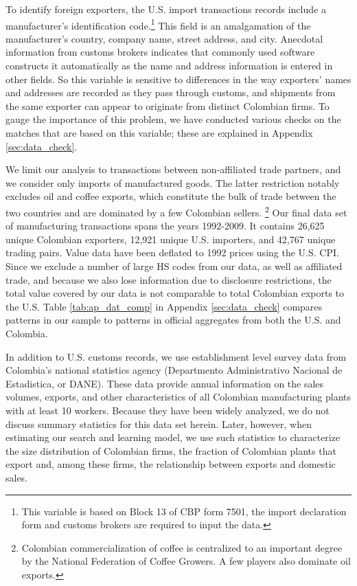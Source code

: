 \documentclass[12pt]{article}
\begin{document}
To identify foreign exporters, the U.S. import transactions records include
a manufacturer's identification code.\footnote{%
This variable is based on Block 13 of CBP form 7501, the import declaration
form and customs brokers are required to input the data.} This field is an
amalgamation of the manufacturer's country, company name, street address,
and city. Anecdotal information from customs brokers indicates that commonly
used software constructs it automatically as the name and address
information is entered in other fields. So this variable is sensitive to
differences in the way exporters' names and addresses are recorded as they
pass through customs, and shipments from the same exporter can appear to
originate from distinct Colombian firms. To gauge the importance of this
problem, we have conducted various checks on the matches that are based on
this variable; these are explained in Appendix \ref{sec:data_check}.

We limit our analysis to transactions between non-affiliated trade partners,
and we consider only imports of manufactured goods. The latter restriction
notably excludes oil and coffee exports, which constitute the bulk of trade
between the two countries and are dominated by a few Colombian sellers.%
\footnote{%
Colombian commercialization of coffee is centralized to an important degree
by the National Federation of Coffee Growers. A few players also dominate
oil exports.} Our final data set of manufacturing transactions spans the
years 1992-2009. It contains 26,625 unique Colombian exporters, 12,921
unique U.S. importers, and 42,767 unique trading pairs. Value data have been
deflated to 1992 prices using the U.S. CPI. Since we exclude a number of
large HS codes from our data, as well as affiliated trade, and because we
also lose information due to disclosure restrictions, the total value
covered by our data is not comparable to total Colombian exports to the U.S.
Table \ref{tab:ap_dat_comp} in Appendix \ref{sec:data_check} compares
patterns in our sample to patterns in official aggregates from both the U.S.
and Colombia.

In addition to U.S. customs records, we use establishment level survey data
from Colombia's national statistics agency (Departmento Administrativo
Nacional de Estadistica, or DANE). These data provide annual information on
the sales volumes, exports, and other characteristics of all Colombian
manufacturing plants with at least 10 workers. Because they have been widely
analyzed, we do not discuss summary statistics for this data set herein.
Later, however, when estimating our search and learning model, we use such
statistics to characterize the size distribution of Colombian firms, the
fraction of Colombian plants that export and, among these firms, the
relationship between exports and domestic sales.
\end{document}
